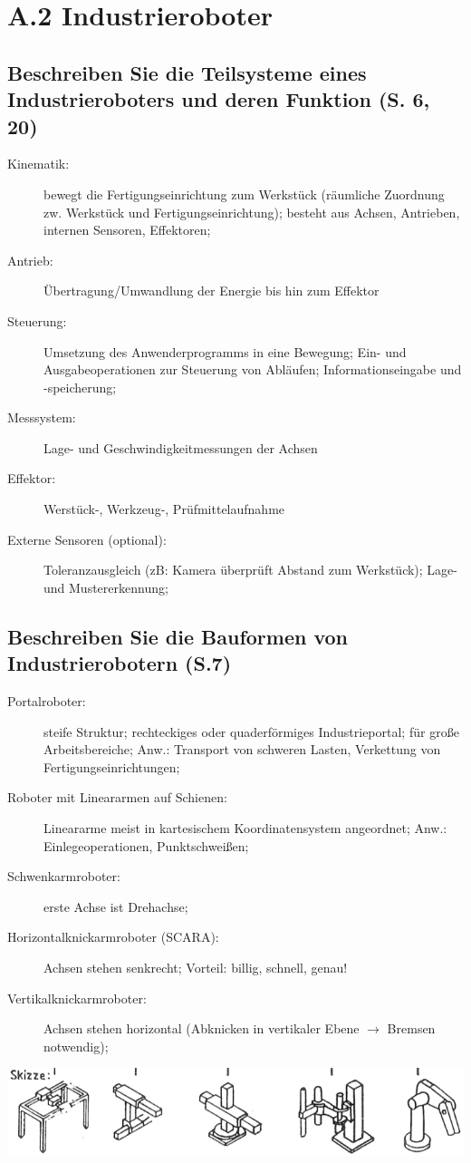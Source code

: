 \section*{A.2 Industrieroboter}

\subsection{Beschreiben Sie die Teilsysteme eines Industrieroboters und deren Funktion (S. 6, 20)}
\begin{description}
	\item[Kinematik:] bewegt die Fertigungseinrichtung zum Werkstück (räumliche Zuordnung zw. 
	  Werkstück und Fertigungseinrichtung); besteht aus Achsen, Antrieben, internen Sensoren, 
	  Effektoren;
	\item[Antrieb:] Übertragung/Umwandlung der Energie bis hin zum Effektor
	\item[Steuerung:] Umsetzung des Anwenderprogramms in eine Bewegung; Ein- und Ausgabeoperationen
	  zur Steuerung von Abläufen; Informationseingabe und -speicherung;
	\item[Messsystem:] Lage- und Geschwindigkeitmessungen der Achsen
	\item[Effektor:] Werstück-, Werkzeug-, Prüfmittelaufnahme
	\item[Externe Sensoren (optional):] Toleranzausgleich (zB: Kamera überprüft Abstand zum 
	  Werkstück); Lage- und Mustererkennung; 
\end{description}

\subsection{Beschreiben Sie die Bauformen von Industrierobotern (S.7)}
\begin{description}
\item[Portalroboter:] steife Struktur; rechteckiges oder quaderförmiges Industrieportal; 
  für große Arbeitsbereiche; Anw.: Transport von schweren Lasten, Verkettung von 
  Fertigungseinrichtungen;
\item[Roboter mit Lineararmen auf Schienen:] Lineararme meist in kartesischem Koordinatensystem
  angeordnet; Anw.: Einlegeoperationen, Punktschweißen;
\item[Schwenkarmroboter:] erste Achse ist Drehachse;
\item[Horizontalknickarmroboter (SCARA):] Achsen stehen senkrecht; Vorteil: billig, schnell, 
  genau!
\item[Vertikalknickarmroboter:] Achsen stehen horizontal (Abknicken in vertikaler Ebene 
  $\rightarrow$ Bremsen notwendig);
\end{description}
\includegraphics[width=\textwidth]{pics/bauarten}

